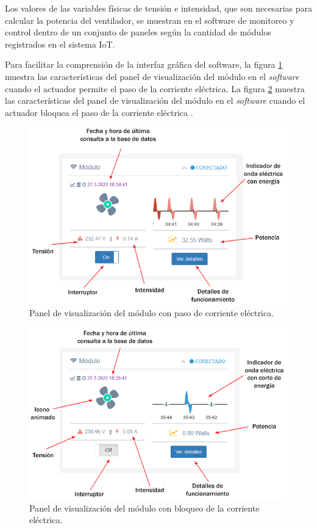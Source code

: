 Los valores de las variables físicas de tensión e intensidad,  que son necesarias para calcular la  potencia del ventilador, se muestran en el software de monitoreo y control dentro de un conjunto de paneles según la cantidad de módulos registrados en el sistema IoT.

Para facilitar la comprensión de la interfaz gráfica del software, la figura \ref{fig:test-panel5} muestra las características del panel de visualización del módulo en el \emph{software} cuando el actuador permite el paso de la corriente eléctrica. La figura \ref{fig:test-panel4} muestra las características del panel de visualización del módulo en el \emph{software} cuando el actuador bloquea el paso de la corriente eléctrica .

\begin{figure}[htpb]
\centering 
\includegraphics[width=1.0\textwidth]{./Figures/test/consumo/panel5.png}
\caption{Panel de visualización del módulo con paso de corriente eléctrica.}
\label{fig:test-panel5}
\end{figure}


\begin{figure}[htpb]
\centering 
\includegraphics[width=1.0\textwidth]{./Figures/test/consumo/panel4.png}
\caption{Panel de visualización del módulo con bloqueo de la corriente eléctrica.}
\label{fig:test-panel4}
\end{figure}

